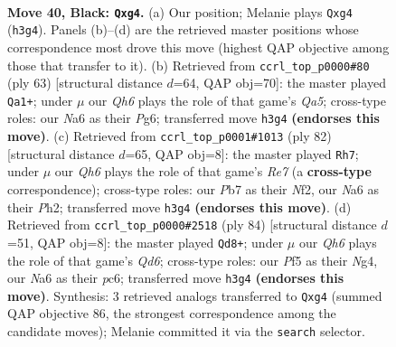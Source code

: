 \documentclass[11pt]{article}
\begin{document}
\clearpage

\begin{figure}[p]\centering
\begin{subfigure}{0.46\textwidth}\centering
\resizebox{\linewidth}{!}{%
\newchessgame
\chessboard[
  setfen={r5k1/pp6/n2Q4/2pP1p2/6P1/P5Pq/1P6/2RR2K1 b - - 0 40},
  showmover=false,
  pgfstyle=straightmove, color=movearrow, markmove={h3-g4}
]}
\caption{}
\end{subfigure}\hfill
\begin{subfigure}{0.46\textwidth}\centering
\resizebox{\linewidth}{!}{%
\newchessgame
\chessboard[
  setfen={1r4k1/p6p/5Qp1/3p4/qp1P3P/2P5/2P2P2/2K1R2R b - - 0 32},
  showmover=false,
  pgfstyle=straightmove, color=movearrow, markmove={a4-a1}
]}
\caption{}
\end{subfigure}
\\[4pt]
\begin{subfigure}{0.46\textwidth}\centering
\resizebox{\linewidth}{!}{%
\newchessgame
\chessboard[
  setfen={5k2/4R3/2p2r2/2Ppb1qp/1P6/3Q1pP1/5N1P/5K2 w - - 12 42},
  showmover=false,
  pgfstyle=straightmove, color=movearrow, markmove={e7-h7}
]}
\caption{}
\end{subfigure}\hfill
\begin{subfigure}{0.46\textwidth}\centering
\resizebox{\linewidth}{!}{%
\newchessgame
\chessboard[
  setfen={7k/5b2/2pQr2p/p3p3/P1P2pN1/3P1q2/8/4K1R1 w - - 4 43},
  showmover=false,
  pgfstyle=straightmove, color=movearrow, markmove={d6-d8}
]}
\caption{}
\end{subfigure}
\caption{\textbf{Move 40, Black: \texttt{Qxg4}.} (a) Our position; Melanie plays \texttt{Qxg4} (\texttt{h3g4}). Panels (b)--(d) are the retrieved master positions whose correspondence most drove this move (highest QAP objective among those that transfer to it). (b) Retrieved from \texttt{ccrl\_top\_p0000\#80} (ply 63) [structural distance $d$=64, QAP obj=70]: the master played \texttt{Qa1+}; under $\mu$ our \emph{Qh6} plays the role of that game's \emph{Qa5}; cross-type roles: our \emph{N}a6 as their \emph{P}g6; transferred move \texttt{h3g4} \textbf{(endorses this move)}. (c) Retrieved from \texttt{ccrl\_top\_p0001\#1013} (ply 82) [structural distance $d$=65, QAP obj=8]: the master played \texttt{Rh7}; under $\mu$ our \emph{Qh6} plays the role of that game's \emph{Re7} (a \textbf{cross-type} correspondence); cross-type roles: our \emph{P}b7 as their \emph{N}f2, our \emph{N}a6 as their \emph{P}h2; transferred move \texttt{h3g4} \textbf{(endorses this move)}. (d) Retrieved from \texttt{ccrl\_top\_p0000\#2518} (ply 84) [structural distance $d$=51, QAP obj=8]: the master played \texttt{Qd8+}; under $\mu$ our \emph{Qh6} plays the role of that game's \emph{Qd6}; cross-type roles: our \emph{P}f5 as their \emph{N}g4, our \emph{N}a6 as their \emph{p}c6; transferred move \texttt{h3g4} \textbf{(endorses this move)}. Synthesis: 3 retrieved analogs transferred to \texttt{Qxg4} (summed QAP objective 86, the strongest correspondence among the candidate moves); Melanie committed it via the \texttt{search} selector.}
\label{fig:thought-m79}
\end{figure}
\end{document}
